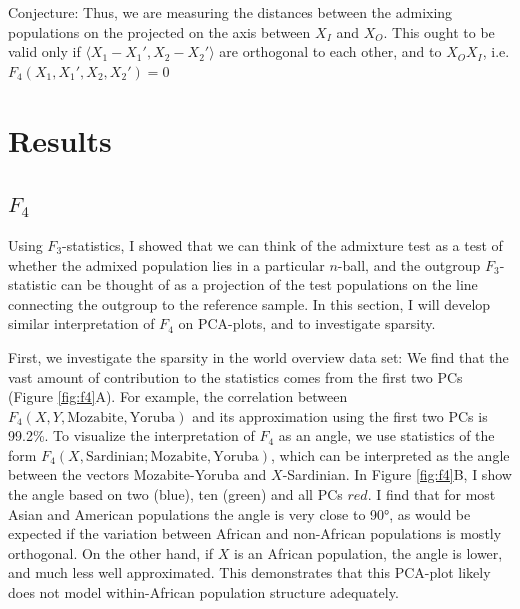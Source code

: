 \documentclass[12pt,a4pape, fullpage]{article}
\begin{document}
Conjecture: Thus, we are measuring the distances between the admixing populations on the projected on the axis between $X_I$ and $X_O$. This ought to be valid only if $\langle X_1 - X_1', X_2 - X_2' \rangle$ are orthogonal to each other, and to $X_OX_I$, i.e.
$F_4(X_1, X_1', X_2, X_2') = 0$
 
	
\section{Results}
\subsection{$F_4$}
Using $F_3$-statistics, I showed that we can think of the admixture test as a test of whether the admixed population lies in a particular $n$-ball, and the outgroup $F_3$-statistic can be thought of as a projection of the test populations on the line connecting the outgroup to the reference sample. In this section, I will develop similar interpretation of $F_4$ on PCA-plots, and to investigate sparsity. 

First, we investigate the sparsity in the world overview data set: We find that the vast amount of contribution to the statistics comes from the first two PCs (Figure \ref{fig:f4}A). For example, the correlation between $F_4(X, Y, \text{Mozabite}, \text{Yoruba})$ and its approximation using the first two PCs is 99.2\%. To visualize the interpretation of $F_4$ as an angle, we use statistics of the form $F_4(X, \text{Sardinian}; \text{Mozabite}, \text{Yoruba})$, which can be interpreted as the angle between the vectors Mozabite-Yoruba and $X$-Sardinian. In Figure \ref{fig:f4}B, I show the angle based on two (blue), ten (green) and all PCs $red$. I find that for most Asian and American populations the angle is very close to 90°, as would be expected if the variation between African and non-African populations is mostly orthogonal. On the other hand, if $X$ is an African population, the angle is lower, and much less well approximated. This demonstrates that this PCA-plot likely does not model within-African population structure adequately. 
\end{document}
